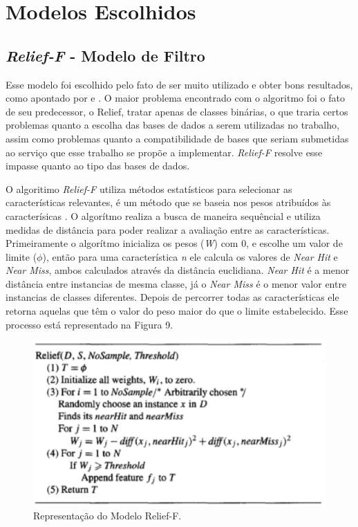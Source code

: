 \section{Modelos Escolhidos}


\subsection{\textit{Relief-F} - Modelo de Filtro}

Esse modelo foi escolhido pelo fato de ser muito utilizado e obter bons resultados, como apontado por  e . O maior problema encontrado com o algoritmo foi o fato de seu predecessor, o Relief, tratar apenas de classes binárias, o que traria certos problemas quanto a escolha das bases de dados a serem utilizadas no trabalho, assim como problemas quanto a compatibilidade de bases que seriam submetidas ao serviço que esse trabalho se propõe a implementar. \textit{Relief-F} resolve esse impasse quanto ao tipo das bases de dados.

O algoritimo \textit{Relief-F} utiliza métodos estatísticos para selecionar as características relevantes, é um método que se baseia nos pesos atribuídos às caracterísicas \cite{dash_1997}. O algorítmo realiza a busca de maneira sequêncial e utiliza medidas de distância para poder realizar a avaliação entre as características. Primeiramente o algorítmo inicializa os pesos (\textit{W}) com 0, e escolhe um valor de limite ($\phi$), então para uma característica \textit{n} ele calcula os valores de \textit{Near Hit} e \textit{Near Miss}, ambos calculados através da distância euclidiana. \textit{Near Hit} é a menor distância entre instancias de mesma classe, já o \textit{Near Miss} é o menor valor entre instancias de classes diferentes. Depois de percorrer todas as características ele retorna aquelas que têm o valor do peso maior do que o limite estabelecido. Esse processo está representado na Figura 9.

\begin{figure}[h]
	\centering
	\label{fig11}
		\includegraphics[keepaspectratio=true,scale=0.7]{figuras/fig11.eps}
	\caption{Representação do Modelo Relief-F. \cite{dash_1997}}
\end{figure}


